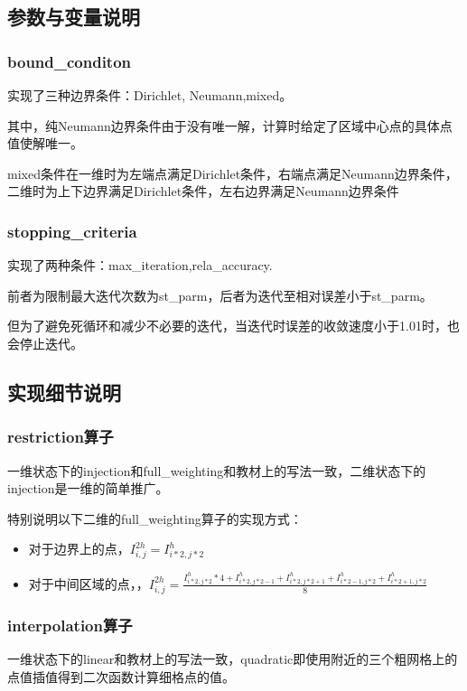 \documentclass[12]{article}%
\begin{document}
\subsection{参数与变量说明}
\subsubsection{bound\_conditon}
实现了三种边界条件：Dirichlet, Neumann,mixed。

其中，纯Neumann边界条件由于没有唯一解，计算时给定了区域中心点的具体点值使解唯一。

mixed条件在一维时为左端点满足Dirichlet条件，右端点满足Neumann边界条件，二维时为上下边界满足Dirichlet条件，左右边界满足Neumann边界条件

\subsubsection{stopping\_criteria}
实现了两种条件：max\_iteration,rela\_accuracy.

前者为限制最大迭代次数为st\_parm，后者为迭代至相对误差小于st\_parm。

但为了避免死循环和减少不必要的迭代，当迭代时误差的收敛速度小于1.01时，也会停止迭代。

\subsection{实现细节说明}
\subsubsection{restriction算子}
一维状态下的injection和full\_weighting和教材上的写法一致，二维状态下的injection是一维的简单推广。

特别说明以下二维的full\_weighting算子的实现方式：

\begin{itemize}
    \item 对于边界上的点，$I^{2h}_{i,j}=I^{h}_{i*2,j*2}$
    \item 对于中间区域的点，，$I^{2h}_{i,j}=\frac{I^{h}_{i*2,j*2}*4+I^{h}_{i*2,j*2-1}+I^{h}_{i*2,j*2+1}+I^{h}_{i*2-1,j*2}+I^{h}_{i*2+1,j*2}}{8}$
\end{itemize}
\subsubsection{interpolation算子}
一维状态下的linear和教材上的写法一致，quadratic即使用附近的三个粗网格上的点值插值得到二次函数计算细格点的值。
\end{document}
